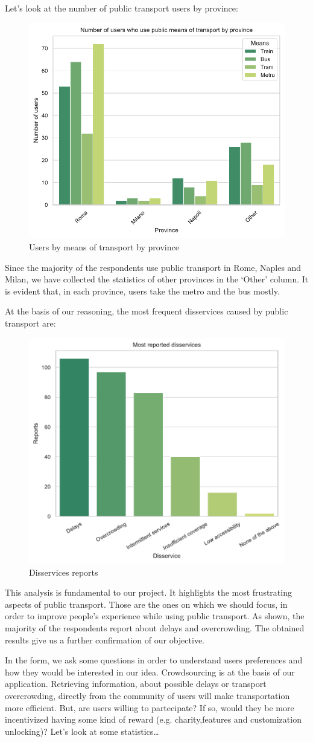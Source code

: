 \documentclass[a4paper, 11pt]{report}
\begin{document}
Let's look at the number of public transport users by province:
\begin{figure}[H]
	\centering
	\includegraphics[width=.5\textwidth]{img/analysis/users_by_means_of_transport_by_province.pdf}
	\caption{Users by means of transport by province}
\end{figure}
Since the majority of the respondents use public transport in Rome, Naples and Milan, we have collected the statistics of other provinces in the `Other' column.
It is evident that, in each province, users take the metro and the bus mostly.

At the basis of our reasoning, the most frequent disservices caused by public transport are:
\begin{figure}[H]
	\centering
	\includegraphics[width=.5\textwidth]{img/analysis/disservices_reports.pdf}
	\caption{Disservices reports}
\end{figure}
This analysis is fundamental to our project. It highlights the most frustrating aspects of public transport.
Those are the ones on which we should focus, in order to improve people's experience while using public transport.
As shown, the majority of the respondents report about delays and overcrowding. The obtained results give us a further confirmation of our objective.


In the form, we ask some questions in order to understand users preferences and how they would be interested 
in our idea. 
Crowdsourcing is at the basis of our application. Retrieving information, about possible delays or 
transport overcrowding, directly from the community of users will make transportation more efficient. 
But, are users willing to partecipate? If so, would they be more incentivized having some kind of reward (e.g. charity,features and customization unlocking)?
Let's look at some statistics\dots
\end{document}
